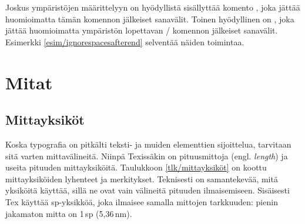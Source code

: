 \noindent
Joskus ympäristöjen määrittelyyn on hyödyllistä sisällyttää komento
, joka jättää huomioimatta tämän komennon
jälkeiset sanavälit. Toinen hyödyllinen on
, joka jättää huomioimatta ympäristön
lopettavan \-/ komennon jälkeiset sanavälit. Esimerkki
\ref{esim/ignorespacesafterend} selventää näiden toimintaa.

\section{Mitat}
\label{luku/mitat}

\subsection{Mittayksiköt}

Koska typografia on pitkälti teksti- ja muiden elementtien sijoittelua,
tarvitaan sitä varten mittavälineitä. Niinpä Texissäkin on pituusmittoja
(engl. \emph{length}) ja useita pituuden mittayksiköitä. Taulukkoon
\ref{tlk/mittayksiköt} on koottu mittayksiköiden lyhenteet ja
merkitykset. Teknisesti on samantekevää, mitä yksiköitä käyttää, sillä
ne ovat vain välineitä pituuden ilmaisemiseen. Sisäisesti Tex käyttää
sp-yksikköä, joka ilmaisee samalla mittojen tarkkuuden: pienin jakamaton
mitta on 1\,sp (5,36\,nm).


